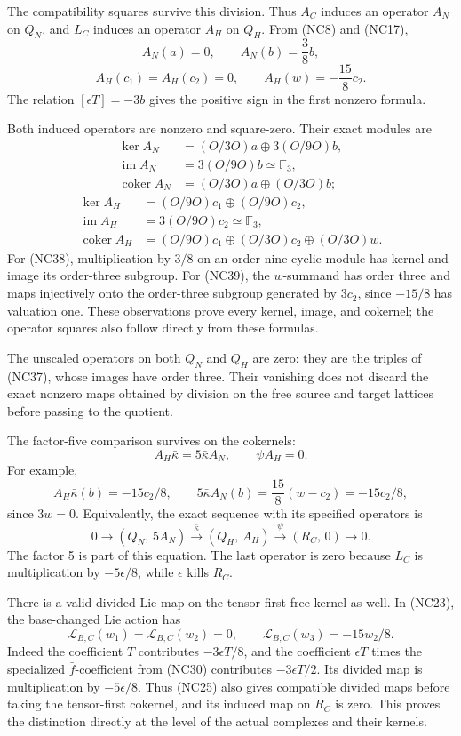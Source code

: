 \documentclass[
]{article}
\begin{document}
The compatibility squares survive this division. Thus \(A_C\) induces an
operator \(A_N\) on \(Q_N\), and \(L_C\) induces an operator \(A_H\) on
\(Q_H\). From (NC8) and (NC17), \[
A_N(a)=0,\qquad A_N(b)=\frac38b,
\] \[
A_H(c_1)=A_H(c_2)=0,\qquad
A_H(w)=-\frac{15}{8}c_2.
\tag{NC37}
\] The relation \([\epsilon T]=-3b\) gives the positive sign in the
first nonzero formula.

Both induced operators are nonzero and square-zero. Their exact modules
are \[
\begin{aligned}
\ker A_N&=(O/3O)a\oplus3(O/9O)b,\\
\operatorname{im}A_N&=3(O/9O)b\simeq\mathbb F_3,\\
\operatorname{coker}A_N&=(O/3O)a\oplus(O/3O)b;
\end{aligned}
\tag{NC38}
\] \[
\begin{aligned}
\ker A_H&=(O/9O)c_1\oplus(O/9O)c_2,\\
\operatorname{im}A_H&=3(O/9O)c_2\simeq\mathbb F_3,\\
\operatorname{coker}A_H&=(O/9O)c_1
\oplus(O/3O)c_2\oplus(O/3O)w.
\end{aligned}
\tag{NC39}
\] For (NC38), multiplication by \(3/8\) on an order-nine cyclic module
has kernel and image its order-three subgroup. For (NC39), the
\(w\)-summand has order three and maps injectively onto the order-three
subgroup generated by \(3c_2\), since \(-15/8\) has valuation one. These
observations prove every kernel, image, and cokernel; the operator
squares also follow directly from these formulas.

The unscaled operators on both \(Q_N\) and \(Q_H\) are zero: they are
the triples of (NC37), whose images have order three. Their vanishing
does not discard the exact nonzero maps obtained by division on the free
source and target lattices before passing to the quotient.

The factor-five comparison survives on the cokernels: \[
A_H\bar\kappa=5\bar\kappa A_N,\qquad \psi A_H=0.
\tag{NC40}
\] For example, \[
A_H\bar\kappa(b)=-15c_2/8,\qquad
5\bar\kappa A_N(b)=\frac{15}{8}(w-c_2)=-15c_2/8,
\] since \(3w=0\). Equivalently, the exact sequence with its specified
operators is \[
0\longrightarrow(Q_N,\,5A_N)
\xrightarrow{\bar\kappa}(Q_H,\,A_H)
\xrightarrow{\psi}(R_C,\,0)
\longrightarrow0.
\tag{NC41}
\] The factor 5 is part of this equation. The last operator is zero
because \(L_C\) is multiplication by \(-5\epsilon/8\), while
\(\epsilon\) kills \(R_C\).

There is a valid divided Lie map on the tensor-first free kernel as
well. In (NC23), the base-changed Lie action has \[
\mathcal L_{B,C}(w_1)=\mathcal L_{B,C}(w_2)=0,\qquad
\mathcal L_{B,C}(w_3)=-15w_2/8.
\tag{NC42}
\] Indeed the coefficient \(T\) contributes \(-3\epsilon T/8\), and the
coefficient \(\epsilon T\) times the specialized \(\bar f\)-coefficient
from (NC30) contributes \(-3\epsilon T/2\). Its divided map is
multiplication by \(-5\epsilon/8\). Thus (NC25) also gives compatible
divided maps before taking the tensor-first cokernel, and its induced
map on \(R_C\) is zero. This proves the distinction directly at the
level of the actual complexes and their kernels.
\end{document}

